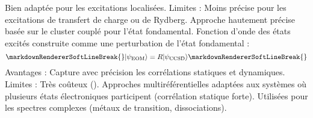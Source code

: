 \markdownRendererUlItem Bien adaptée pour les excitations localisées.\markdownRendererUlItemEnd 
\markdownRendererUlEndTight \markdownRendererUlItemEnd 
\markdownRendererUlItem Limites :\markdownRendererInterblockSeparator
{}\markdownRendererUlBeginTight
\markdownRendererUlItem Moins précise pour les excitations de transfert de charge ou de Rydberg.\markdownRendererUlItemEnd 
\markdownRendererUlEndTight \markdownRendererUlItemEnd 
\markdownRendererUlEndTight \markdownRendererInterblockSeparator
{}\markdownRendererOlBeginTight
{}\markdownRendererInterblockSeparator
{}\markdownRendererUlBeginTight
\markdownRendererUlItem Approche hautement précise basée sur le cluster couplé pour l’état fondamental.\markdownRendererUlItemEnd 
\markdownRendererUlItem Fonction d’onde des états excités construite comme une perturbation de l’état fondamental :\markdownRendererUlItemEnd 
\markdownRendererUlEndTight \markdownRendererOlItemEnd 
\markdownRendererOlEndTight \markdownRendererInterblockSeparator
{}\begin{equation}\markdownRendererSoftLineBreak
{}|\psi_{\text{EOM}}\rangle = R |\psi_{\text{CCSD}}\rangle\markdownRendererSoftLineBreak
{}\end{equation}\markdownRendererInterblockSeparator
{}\markdownRendererUlBeginTight
\markdownRendererUlItem Avantages :\markdownRendererInterblockSeparator
{}\markdownRendererUlBeginTight
\markdownRendererUlItem Capture avec précision les corrélations statiques et dynamiques.\markdownRendererUlItemEnd 
\markdownRendererUlEndTight \markdownRendererUlItemEnd 
\markdownRendererUlItem Limites :\markdownRendererInterblockSeparator
{}\markdownRendererUlBeginTight
\markdownRendererUlItem Très coûteux ().\markdownRendererUlItemEnd 
\markdownRendererUlEndTight \markdownRendererUlItemEnd 
\markdownRendererUlEndTight \markdownRendererInterblockSeparator
{}\markdownRendererOlBeginTight
{}\markdownRendererInterblockSeparator
{}\markdownRendererUlBeginTight
\markdownRendererUlItem Approches multiréférentielles adaptées aux systèmes où plusieurs états électroniques participent (corrélation statique forte).\markdownRendererUlItemEnd 
\markdownRendererUlItem Utilisées pour les spectres complexes (métaux de transition, dissociations).\markdownRendererUlItemEnd 
\markdownRendererUlEndTight \markdownRendererOlItemEnd 
